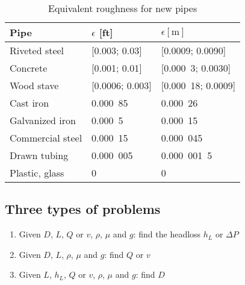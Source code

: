 \documentclass[10pt, twocolumn]{article}
\begin{document}
\begin{table}[ht] %
  \caption{Equivalent roughness for new pipes}
  \label{tab:roughness}
  \begin{center}
    \centering %
    \begin{tabular}{ %
        lll
      }

      Pipe             & \(\epsilon\) [ft] & \(\epsilon [\si{\metre}]\) \\\hline\hline
      Riveted steel    & [0.003; 0.03]     & [0.0009; 0.0090]           \\\hline
      Concrete         & [0.001; 0.01]     & [0.000~3; 0.0030]          \\\hline
      Wood stave       & [0.0006; 0.003]   & [0.000~18; 0.0009]         \\\hline
      Cast iron        & 0.000~85          & 0.000~26                   \\\hline
      Galvanized iron  & 0.000~5           & 0.000~15                   \\\hline
      Commercial steel & 0.000~15          & 0.000~045                  \\\hline
      Drawn tubing     & 0.000~005         & 0.000~001~5                \\\hline
      Plastic, glass   & 0                 & 0
    \end{tabular}
  \end{center}
\end{table}

\subsection{Three types of problems}
\begin{enumerate}
  \item Given \(D\), \(L\), \(Q\) or \(v\), \(\rho\), \(\mu\) and \(g\): find the headloss \(h_L\) or \(\Delta P\)
  \item Given \(D\), \(L\), \(\rho\), \(\mu\) and \(g\): find \(Q\) or \(v\)
  \item Given \(L\), \(h_L\), \(Q\) or \(v\), \(\rho\), \(\mu\) and \(g\): find \(D\)
\end{enumerate}
\end{document}
